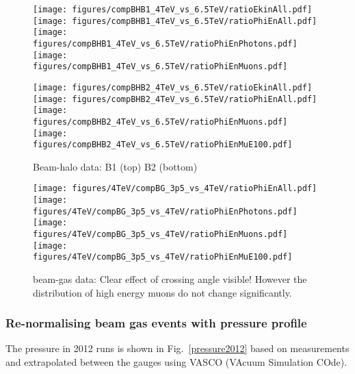 \begin{figure}
\begin{center}
  \texttt{[image: figures/compBHB1\_4TeV\_vs\_6.5TeV/ratioEkinAll.pdf]}
  \texttt{[image: figures/compBHB1\_4TeV\_vs\_6.5TeV/ratioPhiEnAll.pdf]}
  \texttt{[image: figures/compBHB1\_4TeV\_vs\_6.5TeV/ratioPhiEnPhotons.pdf]}
  \texttt{[image: figures/compBHB1\_4TeV\_vs\_6.5TeV/ratioPhiEnMuons.pdf]}

  \texttt{[image: figures/compBHB2\_4TeV\_vs\_6.5TeV/ratioEkinAll.pdf]}
  \texttt{[image: figures/compBHB2\_4TeV\_vs\_6.5TeV/ratioPhiEnAll.pdf]}
  \texttt{[image: figures/compBHB2\_4TeV\_vs\_6.5TeV/ratioPhiEnMuons.pdf]}
  \texttt{[image: figures/compBHB2\_4TeV\_vs\_6.5TeV/ratioPhiEnMuE100.pdf]}
\end{center}
\vspace{-0.6cm}
 \caption{Beam-halo data: B1 (top) B2 (bottom)
  \label{valXingBH}}
\end{figure}



\begin{figure}
\begin{center}
  \texttt{[image: figures/4TeV/compBG\_3p5\_vs\_4TeV/ratioPhiEnAll.pdf]}
  \texttt{[image: figures/4TeV/compBG\_3p5\_vs\_4TeV/ratioPhiEnPhotons.pdf]}
  \texttt{[image: figures/4TeV/compBG\_3p5\_vs\_4TeV/ratioPhiEnMuons.pdf]}
  \texttt{[image: figures/4TeV/compBG\_3p5\_vs\_4TeV/ratioPhiEnMuE100.pdf]}
\end{center}
\vspace{-0.6cm}
 \caption{beam-gas data: Clear effect of crossing angle visible! However the distribution of high energy muons do not change significantly.
  \label{xingCompBG}}
\end{figure}

\subsubsection{Re-normalising beam gas events with pressure profile}

The pressure in 2012 runs is shown in Fig.~\ref{pressure2012} based on measurements and extrapolated between the gauges using VASCO (VAcuum Simulation COde).

